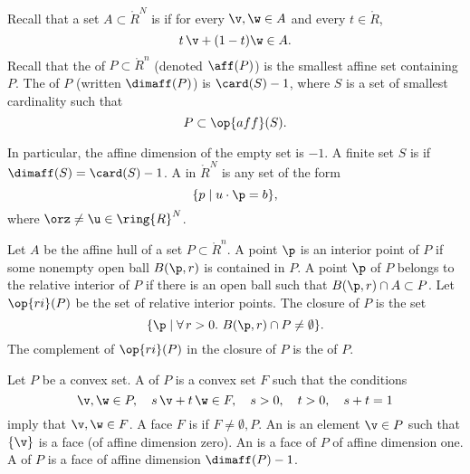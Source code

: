 \begin{definition}\label{def:affine} 
Recall that a set $A\subset\ring{R}^N$ is  if for
every $\v,\w\in A$ and every $t \in \ring{R}$, 
\[ 
  t\, \v + (1-t) \w \in A.
\] 
Recall that
the  of $P\subset\ring{R}^n$ (denoted $\aff(P)$) 
is the smallest affine set
containing $P$.  The  of $P$ (written $\dimaff(P)$) is
$\card(S)-1$, where $S$ is a set of smallest cardinality such that
\[ 
P \subset \op{aff}(S).
\] 
\end{definition}
In particular, the affine dimension of the empty set is $-1$.
A finite set $S$ is  if $\dimaff(S) = \card(S)-1$.
A  in $\ring{R}^N$ is any set of the form
\[ 
\{p\mid u\cdot \p = b\},
\] 
where $\orz\ne\u\in\ring{R}^N$.
%
%



\begin{definition}
Let
$A$ be the affine hull of a set $P\subset\ring{R}^n$.  A point $\p$ is an interior
point of $P$ if some nonempty open ball $B(\p,r)$ is
contained in $P$.  A point $\p$ of $P$ belongs to the
relative interior of $P$ if there is an open ball such that $B(\p,r)
\cap A\subset P$.  Let $\op{ri}(P)$ be the set of relative interior
points.  The closure of $P$ is the set
\[ 
\{\p \mid \forall\,r >0.~ B(\p,r) \cap P \ne \emptyset\}.
\] 
The complement of $\op{ri}(P)$ in the closure of $P$ is the 
 of $P$.
\end{definition}
%
%
%
%
%
%
%

\begin{definition}
Let $P$ be a convex set.  A  of $P$ is a convex set
$F$ such that the conditions
\[ 
\v,\w\in P,\quad s\, \v + t\, \w \in F,\quad s>0,\quad t>0,\quad s+t = 1
\]  
imply that $\v,\w\in F$.  A face $F$ is  if $F\ne
\emptyset,P$.  An  is an element $\v\in P$ such that
$\{\v\}$ is a face (of affine dimension zero).  An   is a face of $P$ of
affine dimension one.  A  of $P$ is a 
face of affine dimension $\dimaff(P)-1$.  %
\end{definition}


